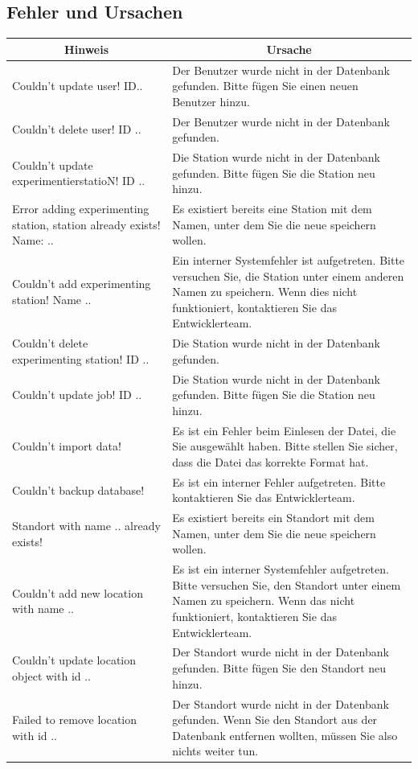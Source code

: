 \documentclass[enabledeprecatedfontcommands,fontsize=12pt,paper=a4,twoside]{scrartcl}
\begin{document}
\subsection{Fehler und Ursachen}
\begin{longtable}[c]{|p{5cm}|p{10cm}|}
\hline
\multicolumn{1}{|c|}{\textbf{Hinweis}}                          & \multicolumn{1}{c|}{\textbf{Ursache}}                                                                                                                                                                                                               \\ \hline
\endhead
Couldn't update user! ID..  & Der Benutzer wurde nicht in der Datenbank gefunden. Bitte fügen Sie einen neuen Benutzer hinzu.\\ \hline
Couldn't delete user! ID .. & Der Benutzer wurde nicht in der Datenbank gefunden. \\ \hline
Couldn't update experimentierstatioN! ID .. & Die Station wurde nicht in der Datenbank gefunden. Bitte fügen Sie die Station neu hinzu. \\ \hline
Error adding experimenting station, station already exists! Name: ..  & Es existiert bereits eine Station mit dem Namen, unter dem Sie die neue speichern wollen. \\ \hline
Couldn't add experimenting station! Name .. & Ein interner Systemfehler ist aufgetreten. Bitte versuchen Sie, die Station unter einem anderen Namen zu speichern. Wenn dies nicht funktioniert, kontaktieren Sie das Entwicklerteam. \\ \hline
Couldn't delete experimenting station! ID .. & Die Station wurde nicht in der Datenbank gefunden. \\ \hline
Couldn't update job! ID .. & Die Station wurde nicht in der Datenbank gefunden. Bitte fügen Sie die Station neu hinzu. \\ \hline
Couldn't import data! & Es ist ein Fehler beim Einlesen der Datei, die Sie ausgewählt haben. Bitte stellen Sie sicher, dass die Datei das korrekte Format hat. \\ \hline
Couldn't backup database! & Es ist ein interner Fehler aufgetreten. Bitte kontaktieren Sie das Entwicklerteam. \\ \hline
Standort with name .. already exists! & Es existiert bereits ein Standort mit dem Namen, unter dem Sie die neue speichern wollen. \\ \hline
Couldn't add new location with name .. & Es ist ein interner Systemfehler aufgetreten. Bitte versuchen Sie, den Standort unter einem Namen zu speichern. Wenn das nicht funktioniert, kontaktieren Sie das Entwicklerteam. \\ \hline
Couldn't update location object with id .. & Der Standort wurde nicht in der Datenbank gefunden. Bitte fügen Sie den Standort neu hinzu. \\ \hline
Failed to remove location with id .. & Der Standort wurde nicht in der Datenbank gefunden. Wenn Sie den Standort aus der Datenbank entfernen wollten, müssen Sie also nichts weiter tun. \\ \hline
\end{longtable}
\end{document}
